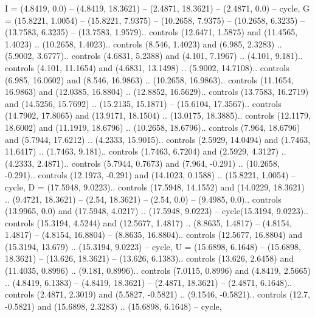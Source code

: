 {I} = {(4.8419, 0.0) -- (4.8419, 18.3621) -- (2.4871, 18.3621) -- (2.4871, 0.0) -- cycle},
{G} = {(15.8221, 1.0054) -- (15.8221, 7.9375) -- (10.2658, 7.9375) -- (10.2658, 6.3235) -- (13.7583, 6.3235) -- (13.7583, 1.9579).. controls (12.6471, 1.5875) and (11.4565, 1.4023) .. (10.2658, 1.4023).. controls (8.546, 1.4023) and (6.985, 2.3283) .. (5.9002, 3.6777).. controls (4.6831, 5.2388) and (4.101, 7.1967) .. (4.101, 9.181).. controls (4.101, 11.1654) and (4.6831, 13.1498) .. (5.9002, 14.7108).. controls (6.985, 16.0602) and (8.546, 16.9863) .. (10.2658, 16.9863).. controls (11.1654, 16.9863) and (12.0385, 16.8804) .. (12.8852, 16.5629).. controls (13.7583, 16.2719) and (14.5256, 15.7692) .. (15.2135, 15.1871) -- (15.6104, 17.3567).. controls (14.7902, 17.8065) and (13.9171, 18.1504) .. (13.0175, 18.3885).. controls (12.1179, 18.6002) and (11.1919, 18.6796) .. (10.2658, 18.6796).. controls (7.964, 18.6796) and (5.7944, 17.6212) .. (4.2333, 15.9015).. controls (2.5929, 14.0494) and (1.7463, 11.6417) .. (1.7463, 9.181).. controls (1.7463, 6.7204) and (2.5929, 4.3127) .. (4.2333, 2.4871).. controls (5.7944, 0.7673) and (7.964, -0.291) .. (10.2658, -0.291).. controls (12.1973, -0.291) and (14.1023, 0.1588) .. (15.8221, 1.0054) -- cycle},
{D} = {(17.5948, 9.0223).. controls (17.5948, 14.1552) and (14.0229, 18.3621) .. (9.4721, 18.3621) -- (2.54, 18.3621) -- (2.54, 0.0) -- (9.4985, 0.0).. controls (13.9965, 0.0) and (17.5948, 4.0217) .. (17.5948, 9.0223) -- cycle(15.3194, 9.0223).. controls (15.3194, 4.5244) and (12.5677, 1.4817) .. (8.8635, 1.4817) -- (4.8154, 1.4817) -- (4.8154, 16.8804) -- (8.8635, 16.8804).. controls (12.5677, 16.8804) and (15.3194, 13.679) .. (15.3194, 9.0223) -- cycle},
{U} = {(15.6898, 6.1648) -- (15.6898, 18.3621) -- (13.626, 18.3621) -- (13.626, 6.1383).. controls (13.626, 2.6458) and (11.4035, 0.8996) .. (9.181, 0.8996).. controls (7.0115, 0.8996) and (4.8419, 2.5665) .. (4.8419, 6.1383) -- (4.8419, 18.3621) -- (2.4871, 18.3621) -- (2.4871, 6.1648).. controls (2.4871, 2.3019) and (5.5827, -0.5821) .. (9.1546, -0.5821).. controls (12.7, -0.5821) and (15.6898, 2.3283) .. (15.6898, 6.1648) -- cycle},
